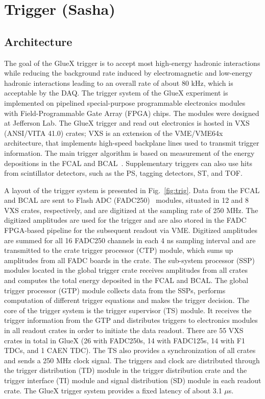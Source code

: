 
\section{Trigger (Sasha) \label{sec:trig}}
\subsection{Architecture \label{sec:trigarchitecture}}
The goal of the GlueX trigger is to accept most high-energy hadronic interactions while reducing the background rate induced by electromagnetic and low-energy hadronic interactions leading to an overall rate of about 80 kHz, which is acceptable by the DAQ.  The trigger system of the GlueX experiment\cite{GlueX:2013twa} is implemented on pipelined special-purpose programmable electronics modules with Field-Programmable Gate Array (FPGA) chips. The modules were designed at Jefferson Lab.  The GlueX trigger and read out electronics is hosted in VXS (ANSI/VITA 41.0) crates; VXS is an extension of the VME/VME64x architecture, that implements high-speed backplane lines used to transmit trigger information. The main trigger algorithm is 
based on measurement of the energy depositions in the FCAL and BCAL~\cite{somov_l1}. Supplementary triggers can also
use hits from scintillator detectors, such as the PS, tagging detectors, ST, and TOF.

A layout of the trigger system is presented in Fig.~\ref{fig:trig}. Data from the FCAL and BCAL are sent to  Flash ADC (FADC250)~\cite{Dong:2007} modules, situated in 12 and 8 VXS crates, respectively, and are digitized at the sampling rate of 250 MHz. The digitized amplitudes are used for the trigger and are also stored in the FADC FPGA-based pipeline for the subsequent readout via VME.
Digitized amplitudes are summed for all 16 FADC250 channels in each 4 ns sampling interval and are transmitted to the crate trigger processor (CTP) module, which sums up amplitudes from all FADC boards in the crate. The sub-system processor (SSP) modules located in the global trigger crate receives amplitudes from all crates and computes the total energy deposited in the FCAL and BCAL. The global trigger processor (GTP) module collects data from the SSPs, performs computation of different trigger equations and makes the trigger decision. The core of the trigger system is the trigger supervisor (TS) module. It receives the trigger information from the GTP and distributes triggers to electronics modules in all readout 
crates in order to initiate the data readout. There are 55 VXS crates in total in GlueX (26 with FADC250s, 14 with  FADC125s, 14 with F1 TDCs, and 1 CAEN TDC). The TS also provides a synchronization of all crates and sends a 250 MHz clock signal. The triggers and clock are distributed through the trigger distribution (TD) module in the trigger distribution crate and the trigger interface (TI) module and signal distribution (SD) module in each readout crate. The GlueX trigger system provides a fixed latency of about 3.1 $\mu$s.

